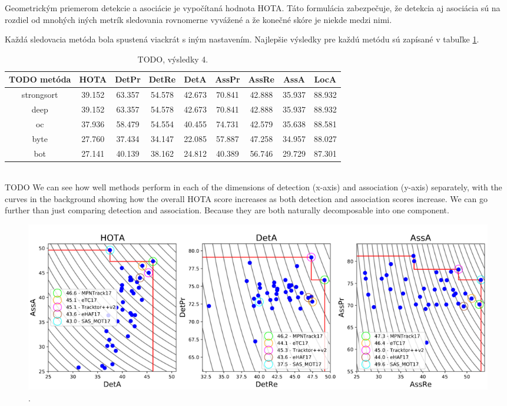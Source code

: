 
Geometrickým priemerom detekcie a asociácie je vypočítaná hodnota HOTA. Táto formulácia zabezpečuje, že detekcia aj asociácia sú na rozdiel od mnohých iných metrík sledovania rovnomerne vyvážené a že konečné skóre je niekde medzi nimi.

Každá sledovacia metóda bola spustená viackrát s iným nastavením. Najlepšie výsledky pre každú metódu sú zapísané v tabuľke \ref{table:hota1}.
\\
\begin{table}[ht]
\centering
\begin{tabular}{|c c c c c c c c c|}
 \hline
TODO metóda & HOTA & DetPr & DetRe & DetA & AssPr & AssRe & AssA & LocA \\ [0.5ex]
 \hline
strongsort & 39.152 & 63.357 & 54.578 & 42.673 & 70.841 & 42.888 & 35.937 & 88.932 \\ [0.1ex]
deep & 39.152 & 63.357 & 54.578 & 42.673 & 70.841 & 42.888 & 35.937 & 88.932 \\ [0.1ex]
oc & 37.936 & 58.479 & 54.554 & 40.455 & 74.731 & 42.579 & 35.638 & 88.581 \\ [0.1ex]
byte & 27.760 & 37.434 & 34.147 & 22.085 & 57.887 & 47.258 & 34.957 & 88.027 \\ [0.1ex]
bot & 27.141 & 40.139 & 38.162 & 24.812 & 40.389 & 56.746 & 29.729 & 87.301 \\ [0.1ex]
 \hline
\end{tabular}
\caption{TODO, výsledky 4.}
\label{table:hota1}
\end{table}
\\
TODO We can see how well methods perform in each of the dimensions of detection (x-axis) and association (y-axis) separately, with the curves in the background showing how the overall HOTA score increases as both detection and association scores increase. We can go further than just comparing detection and association. Because they are both naturally decomposable into one component.
\begin{figure}[ht]
    \centering
    \includegraphics[width=1\textwidth]{images/05/compare.png}
    \caption{.}
    \label{img:road}
\end{figure}

